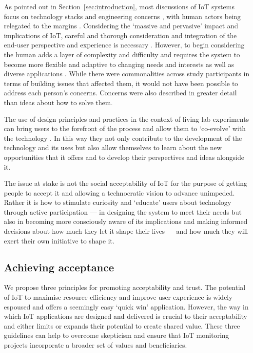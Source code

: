 As pointed out in Section~\ref{sec:introduction}, most discussions of IoT
systems 
focus on technology stacks
and engineering concerns \cite{Puschel-2016-WIAS,Heidt-2016-PGFT} , with human actors being relegated to the
margins \cite{Shin-2014-ASTF}.
Considering the ‘massive and pervasive’ impact and implications of
IoT, careful and thorough consideration and integration of the
end-user perspective and experience is
necessary \cite{Ziegler-2017-CIOT}.  However, to begin considering the
human adds a layer of complexity and difficulty and requires the
system to become more flexible and adaptive to changing needs and
interests as well as diverse applications \cite{Shin-2017-UTIO}.
While there were commonalities across study participants in terms of
building issues that affected them, it would not have been possible to
address each person’s concerns. Concerns were also described in
greater detail than ideas about how to solve them.

The use of design principles and practices in the context of living
lab experiments can bring users to the forefront of the process and
allow them to ‘co-evolve’ with the technology \cite{Shin-2017-UTIO}.
In this way they not only contribute to the development of the
technology and its uses but also allow themselves to learn about the
new opportunities that it offers and to develop their perspectives and
ideas alongside it.

The issue at stake is not the social acceptability of IoT for the
purpose of getting people to accept it and allowing a technocratic
vision to advance unimpeded. Rather it is how to stimulate curiosity
and ‘educate’ users about technology through active participation ---
in designing the system to meet their needs but also in becoming more
consciously aware of its implications and making informed decisions
about how much they let it shape their lives --- and how much they
will exert their own initiative to shape it.

\subsection{Achieving acceptance}
\label{sec:achieving-acceptance}

We propose three principles for promoting acceptability and trust. The
potential of IoT to maximise resource efficiency and improve user
experience is widely espoused and offers a seemingly easy ‘quick win’
application. However, the way in which IoT applications are designed
and delivered is crucial to their acceptability and either limits or
expands their potential to create shared value. These three guidelines
can help to overcome skepticism and ensure that IoT monitoring
projects incorporate a broader set of values and beneficiaries.

